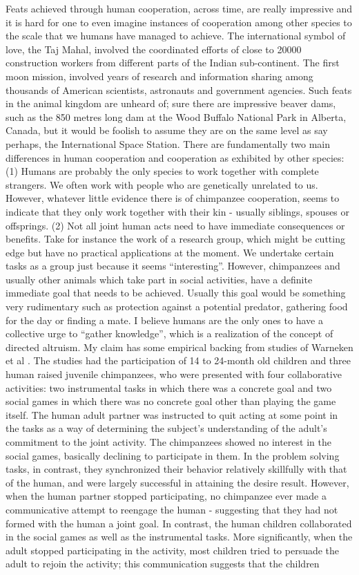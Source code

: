 \documentclass[12pt, letter]{article}
\begin{document}
Feats achieved through human cooperation, across time, are really impressive and it is hard for one to even imagine instances of cooperation among other species to the scale that we humans have managed to achieve. The international symbol of love, the Taj Mahal, involved the coordinated efforts of close to 20000 construction workers from different parts of the Indian sub-continent. The first moon mission, involved years of research and information sharing among thousands of American scientists, astronauts and government agencies. Such feats in the animal kingdom are unheard of; sure there are impressive beaver dams, such as the 850 metres long dam at the Wood Buffalo National Park in Alberta, Canada, but it would be foolish to assume they are on the same level as say perhaps, the International Space Station. There are fundamentally two main differences in human cooperation and cooperation as exhibited by other species: (1) Humans are probably the only species to work together with complete strangers. We often work with people who are genetically unrelated to us. However, whatever little evidence there is of chimpanzee cooperation, seems to indicate that they only work together with their kin - usually siblings, spouses or offsprings. (2) Not all joint human acts need to have immediate consequences or benefits. Take for instance the work of a research group, which might be cutting edge but have no practical applications at the moment. We undertake certain tasks as a group just because it seems ``interesting''. However, chimpanzees and usually other animals which take part in social activities, have a definite immediate goal that needs to be achieved. Usually this goal would be something very rudimentary such as protection against a potential predator, gathering food for the day or finding a mate. I believe humans are the only ones to have a collective urge to ``gather knowledge'', which is a realization of the concept of directed altruism. My claim has some empirical backing from studies of Warneken et al \cite{warneken2007spontaneous}. The studies had the participation of 14 to 24-month old children and three human raised juvenile chimpanzees, who were presented with four collaborative activities: two instrumental tasks in which there was a concrete goal and two social games in which there was no concrete goal other than playing the game itself. The human adult part­ner was instructed to quit acting at some point in the tasks as a way of determining the subject's understanding of the adult's commitment to the joint activity. The chimpanzees showed no interest in the social games, basically declining to participate in them. In the problem­ solving tasks, in contrast, they synchronized their behavior rela­tively skillfully with that of the human, and were largely successful in attaining the desire result. However, when the human partner stopped participating, no chimpanzee ever made a communicative attempt to reengage the human - suggesting that they had not formed with the human a joint goal. In contrast, the human children col­laborated in the social games as well as the instrumental tasks. More significantly, when the adult stopped participating in the activity, most children tried to persuade the adult to rejoin the activity; this communication suggests that the children 
\end{document}
